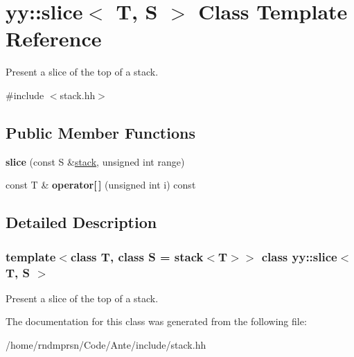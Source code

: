 \hypertarget{classyy_1_1slice}{}\section{yy\+:\+:slice$<$ T, S $>$ Class Template Reference}
\label{classyy_1_1slice}


Present a slice of the top of a stack.  




{\ttfamily \#include $<$stack.\+hh$>$}

\subsection*{Public Member Functions}
\begin{DoxyCompactItemize}
\item 
\mbox{\label{classyy_1_1slice_a09b1750a81ae90227fdceb482fa06797}} 
{\bfseries slice} (const S \&\hyperlink{classyy_1_1stack}{stack}, unsigned int range)
\item 
\mbox{\label{classyy_1_1slice_a1b3639b2fffe50544d335fb3f5763c1f}} 
const T \& {\bfseries operator\mbox{[}$\,$\mbox{]}} (unsigned int i) const
\end{DoxyCompactItemize}


\subsection{Detailed Description}
\subsubsection*{template$<$class T, class S = stack$<$\+T$>$$>$\newline
class yy\+::slice$<$ T, S $>$}

Present a slice of the top of a stack. 

The documentation for this class was generated from the following file\+:\begin{DoxyCompactItemize}
\item 
/home/rndmprsn/\+Code/\+Ante/include/stack.\+hh\end{DoxyCompactItemize}
